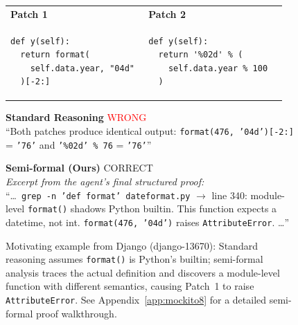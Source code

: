 \documentclass[]{meta}
\begin{document}
\begin{figure}[t]
\centering
\begin{tcolorbox}[
  colback=white,
  colframe=gray!70,
  width=\linewidth,
  boxrule=0.5pt,
  arc=3pt,
  title={\textbf{Task:} Are these two patches equivalent (same test outcomes)?},
  fonttitle=\small,
  coltitle=black,
  colbacktitle=gray!15
]
\small

\begin{tcolorbox}[colback=blue!3, colframe=blue!30, boxrule=0.3pt, arc=2pt, left=3pt, right=3pt, top=3pt, bottom=3pt]
\begin{tabular}{@{}p{0.47\linewidth}|p{0.47\linewidth}@{}}
\textbf{Patch 1} & \textbf{Patch 2} \\[0.3em]
\begin{verbatim}
def y(self):
  return format(
    self.data.year, "04d"
  )[-2:]
\end{verbatim}
&
\begin{verbatim}
def y(self):
  return '%02d' % (
    self.data.year % 100
  )
\end{verbatim}
\end{tabular}
\end{tcolorbox}

\vspace{0.4em}

\begin{tcolorbox}[colback=red!5, colframe=red!40, boxrule=0.3pt, arc=2pt, left=3pt, right=3pt, top=2pt, bottom=2pt]
\textbf{Standard Reasoning} \hfill \textcolor{red}{ WRONG}\\[0.2em]
\footnotesize ``Both patches produce identical output: \texttt{format(476, '04d')[-2:]} = \texttt{'76'} and \texttt{'\%02d' \% 76} = \texttt{'76'}''
\end{tcolorbox}

\vspace{0.3em}

\begin{tcolorbox}[colback=green!5, colframe=green!50!black, boxrule=0.3pt, arc=2pt, left=3pt, right=3pt, top=2pt, bottom=2pt]
\textbf{Semi-formal (Ours)} \hfill \textcolor{green!50!black}{ CORRECT}\\[0.2em]
\footnotesize \emph{Excerpt from the agent's final structured proof:}\\
``\ldots\ \texttt{grep -n 'def format' dateformat.py} $\rightarrow$ line 340: module-level \texttt{format()} shadows Python builtin. This function expects a datetime, not int. \texttt{format(476, '04d')} raises \texttt{AttributeError}. \ldots''
\end{tcolorbox}

\end{tcolorbox}
\caption{Motivating example from Django (django-13670): Standard reasoning assumes \texttt{format()} is Python's builtin; semi-formal analysis traces the actual definition and discovers a module-level function with different semantics, causing Patch~1 to raise \texttt{AttributeError}. See Appendix~\ref{app:mockito8} for a detailed semi-formal proof walkthrough.}
\label{fig:motivating-example}
\end{figure}
\end{document}
